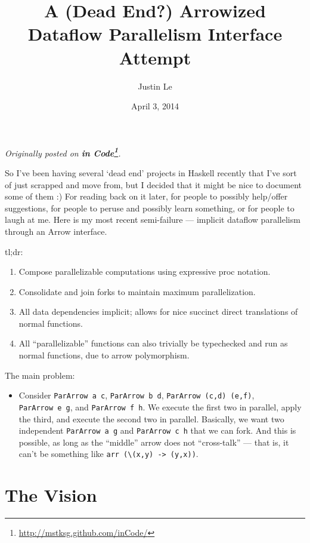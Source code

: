 \documentclass[]{article}
\title{A (Dead End?) Arrowized Dataflow Parallelism Interface Attempt}
\author{Justin Le}
\date{April 3, 2014}
\renewcommand{\href}[2]{#2\footnote{\url{#1}}}
\begin{document}
\maketitle

\emph{Originally posted on
\textbf{\href{http://mstksg.github.com/inCode/}{in Code}}.}

So I've been having several `dead end' projects in Haskell recently that
I've sort of just scrapped and move from, but I decided that it might be
nice to document some of them :) For reading back on it later, for
people to possibly help/offer suggestions, for people to peruse and
possibly learn something, or for people to laugh at me. Here is my most
recent semi-failure --- implicit dataflow parallelism through an Arrow
interface.

tl;dr:

\begin{enumerate}
\def\labelenumi{\arabic{enumi}.}
\tightlist
\item
  Compose parallelizable computations using expressive proc notation.
\item
  Consolidate and join forks to maintain maximum parallelization.
\item
  All data dependencies implicit; allows for nice succinct direct
  translations of normal functions.
\item
  All ``parallelizable'' functions can also trivially be typechecked and
  run as normal functions, due to arrow polymorphism.
\end{enumerate}

The main problem:

\begin{itemize}
\tightlist
\item
  Consider \texttt{ParArrow\ a\ c}, \texttt{ParArrow\ b\ d},
  \texttt{ParArrow\ (c,d)\ (e,f)}, \texttt{ParArrow\ e\ g}, and
  \texttt{ParArrow\ f\ h}. We execute the first two in parallel, apply
  the third, and execute the second two in parallel. Basically, we want
  two independent \texttt{ParArrow\ a\ g} and \texttt{ParArrow\ c\ h}
  that we can fork. And this is possible, as long as the ``middle''
  arrow does not ``cross-talk'' --- that is, it can't be something like
  \texttt{arr\ (\textbackslash{}(x,y)\ -\textgreater{}\ (y,x))}.
\end{itemize}

\section{The Vision}\label{the-vision}
\end{document}
